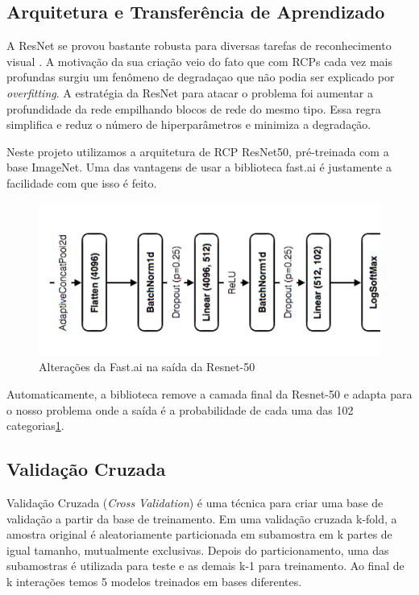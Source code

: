 \documentclass[conference]{IEEEtran}
\begin{document}
\subsection{Arquitetura e Transferência de Aprendizado}

A ResNet se provou bastante robusta para diversas tarefas de reconhecimento visual \cite{resnext}.  A motivação da sua criação veio do fato que com RCPs cada vez mais profundas surgiu um fenômeno de degradaçao que não podia ser explicado por \textit{overfitting}. A estratégia da ResNet para atacar o problema foi aumentar a profundidade da rede empilhando blocos de rede do mesmo tipo. Essa regra simplifica e reduz o número de hiperparâmetros e minimiza a degradação.

Neste projeto utilizamos a arquitetura de RCP ResNet50, pré-treinada com a base ImageNet. Uma das vantagens de usar a biblioteca fast.ai\cite{fastai} é justamente a facilidade com que isso é feito. 
\begin{figure}[ht!]
\begin{center}
\includegraphics[width=.75\columnwidth]{resnet-50-2.png}
\caption{Alterações da Fast.ai na saída da Resnet-50}
\label{resnet50}
\end{center}
\end{figure}

Automaticamente, a biblioteca remove a camada final da Resnet-50 e adapta para o nosso problema onde a saída é a probabilidade de cada uma das 102 categorias\ref{resnet50}.


 
\subsection{Validação Cruzada}
Validação Cruzada (\textit{Cross Validation}) é uma técnica para criar uma base de validação a partir da base de treinamento. Em uma validação cruzada k-fold, a amostra original é aleatoriamente particionada em subamostra em k partes de igual tamanho, mutualmente exclusivas.  Depois do particionamento, uma das subamostras é utilizada para teste e as demais k-1 para treinamento. Ao final de k interações temos 5 modelos treinados em bases diferentes.
\end{document}
